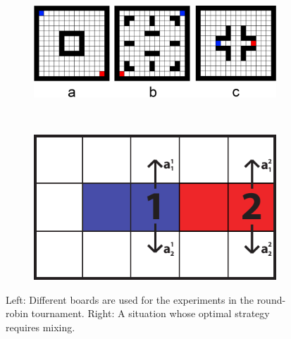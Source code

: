 \documentclass{article}
\begin{document}

\begin{figure}
\centering 
\begin{subfigure}[c]{0.5\textwidth}
\centering
\includegraphics[width=\textwidth]{images/boards.png} 
\end{subfigure}
~~~~~~~~~
\begin{subfigure}[c]{0.29\textwidth}
\centering
\includegraphics[width=\textwidth]{images/stochastic.pdf}
\end{subfigure}
\caption{Left: Different boards are used for the experiments in the round-robin tournament. Right: A situation whose optimal strategy requires mixing. \label{fig:boards-example}}
\end{figure}
\end{document}

